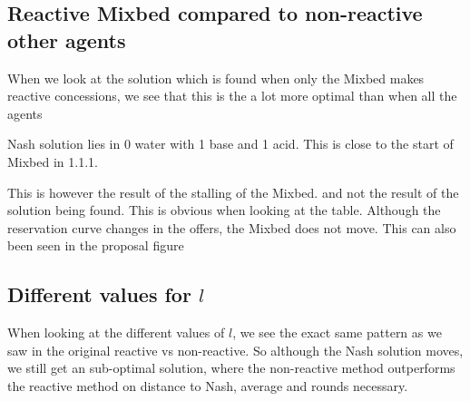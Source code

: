 \clearpage
\subsection{Reactive Mixbed compared to non-reactive other agents}
When we look at the solution which is found when only the Mixbed makes reactive concessions, we see that this is the a lot more optimal than when all the agents 



Nash solution lies in 0 water with 1 base and 1 acid. This is close to the start of Mixbed in 1.1.1. 

This is however the result of the stalling of the Mixbed. and not the result of the solution being found. This is obvious when looking at the table. Although the reservation curve changes in the offers, the Mixbed does not move. This can also been seen in the proposal figure


\subsection{Different values for $l$}
When looking at the different values of $l$, we see the exact same pattern as we saw in the original reactive vs non-reactive. So although the Nash solution moves, we still get an sub-optimal solution, where the non-reactive method outperforms the reactive method on distance to Nash, average and rounds necessary.



